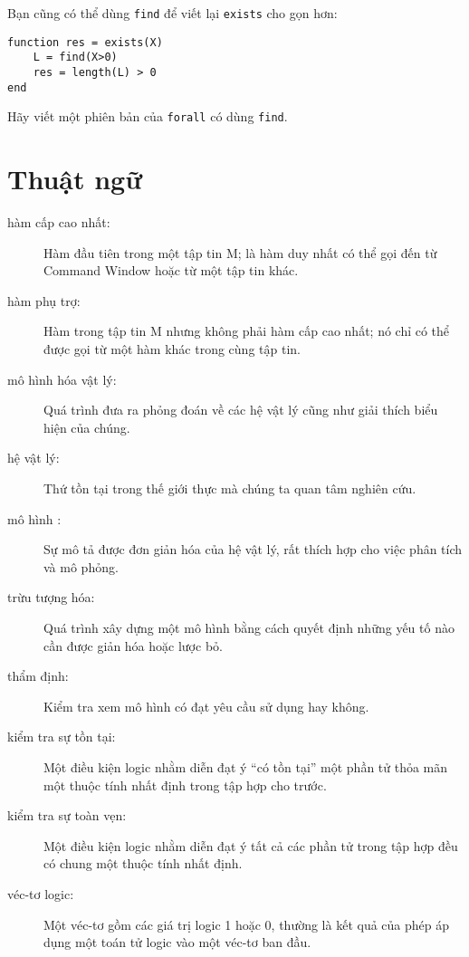 \documentclass[12pt]{book}
\begin{document}
Bạn cũng có thể dùng {\tt find} để viết lại {\tt exists} cho gọn hơn:

\begin{verbatim}
function res = exists(X)
    L = find(X>0)
    res = length(L) > 0
end
\end{verbatim}
%
\begin{ex}
Hãy viết một phiên bản của {\tt forall} có dùng {\tt find}.
\end{ex}


\section{Thuật ngữ}

\begin{description}

\item[hàm cấp cao nhất:]  Hàm đầu tiên trong một tập tin M;
là hàm duy nhất có thể gọi đến từ Command Window hoặc từ
một tập tin khác.

\item[hàm phụ trợ:] Hàm trong tập tin M nhưng không phải
hàm cấp cao nhất; nó chỉ có thể được gọi từ một hàm khác
trong cùng tập tin.

\item[mô hình hóa vật lý:] Quá trình đưa ra phỏng đoán về các
hệ vật lý cũng như giải thích biểu hiện của chúng.

\item[hệ vật lý:] Thứ tồn tại trong thế giới thực mà chúng ta
quan tâm nghiên cứu.

\item[mô hình :] Sự mô tả được đơn giản hóa của hệ vật lý,
rất thích hợp cho việc phân tích và mô phỏng.

\item[trừu tượng hóa:] Quá trình xây dựng một mô hình bằng cách
quyết định những yếu tố nào cần được giản hóa hoặc lược bỏ.

\item[thẩm định:] Kiểm tra xem mô hình có đạt yêu cầu sử dụng
hay không.

\item[kiểm tra sự tồn tại:] Một điều kiện logic nhằm diễn đạt ý
``có tồn tại'' một phần tử thỏa mãn một thuộc tính nhất định 
trong tập hợp cho trước.

\item[kiểm tra sự toàn vẹn:] Một điều kiện logic nhằm diễn đạt ý
tất cả các phần tử trong tập hợp đều có chung một thuộc tính nhất định.

\item[véc-tơ logic:] Một véc-tơ gồm các giá trị logic 1 hoặc 0, 
thường là kết quả của phép áp dụng một toán tử logic vào một 
véc-tơ ban đầu.


\end{description}
\end{document}
